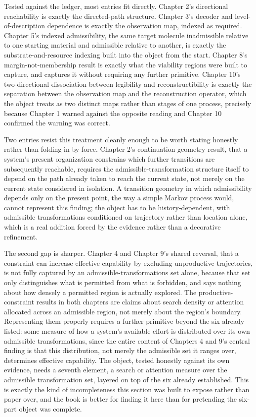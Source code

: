 \documentclass[11pt]{book}
\begin{document}
Tested against the ledger, most entries fit directly. Chapter 2's directional reachability is exactly the directed-path structure. Chapter 3's decoder and level-of-description dependence is exactly the observation map, indexed as required. Chapter 5's indexed admissibility, the same target molecule inadmissible relative to one starting material and admissible relative to another, is exactly the substrate-and-resource indexing built into the object from the start. Chapter 8's margin-not-membership result is exactly what the viability regions were built to capture, and captures it without requiring any further primitive. Chapter 10's two-directional dissociation between legibility and reconstructibility is exactly the separation between the observation map and the reconstruction operator, which the object treats as two distinct maps rather than stages of one process, precisely because Chapter 1 warned against the opposite reading and Chapter 10 confirmed the warning was correct.

Two entries resist this treatment cleanly enough to be worth stating honestly rather than folding in by force. Chapter 2's continuation-geometry result, that a system's present organization constrains which further transitions are subsequently reachable, requires the admissible-transformation structure itself to depend on the path already taken to reach the current state, not merely on the current state considered in isolation. A transition geometry in which admissibility depends only on the present point, the way a simple Markov process would, cannot represent this finding; the object has to be history-dependent, with admissible transformations conditioned on trajectory rather than location alone, which is a real addition forced by the evidence rather than a decorative refinement.

The second gap is sharper. Chapter 4 and Chapter 9's shared reversal, that a constraint can increase effective capability by excluding unproductive trajectories, is not fully captured by an admissible-transformations set alone, because that set only distinguishes what is permitted from what is forbidden, and says nothing about how densely a permitted region is actually explored. The productive-constraint results in both chapters are claims about search density or attention allocated across an admissible region, not merely about the region's boundary. Representing them properly requires a further primitive beyond the six already listed: some measure of how a system's available effort is distributed over its own admissible transformations, since the entire content of Chapters 4 and 9's central finding is that this distribution, not merely the admissible set it ranges over, determines effective capability. The object, tested honestly against its own evidence, needs a seventh element, a search or attention measure over the admissible transformation set, layered on top of the six already established. This is exactly the kind of incompleteness this section was built to expose rather than paper over, and the book is better for finding it here than for pretending the six-part object was complete.
\end{document}
